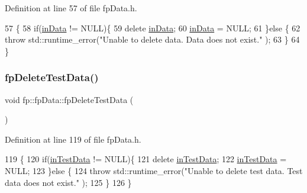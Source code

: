 Definition at line 57 of file fp\+Data.\+h.


\begin{DoxyCode}
57                                \{
58                 \textcolor{keywordflow}{if}(\hyperlink{classfp_1_1fpData_a49d7c3f58bcf88843c25b1b0c9714ebe}{inData} != NULL)\{
59                     \textcolor{keyword}{delete} \hyperlink{classfp_1_1fpData_a49d7c3f58bcf88843c25b1b0c9714ebe}{inData};
60                     \hyperlink{classfp_1_1fpData_a49d7c3f58bcf88843c25b1b0c9714ebe}{inData} = NULL;
61                 \}\textcolor{keywordflow}{else} \{
62                     \textcolor{keywordflow}{throw} std::runtime\_error(\textcolor{stringliteral}{"Unable to delete data.  Data does not exist."} );
63                 \}
64             \}
\end{DoxyCode}
\mbox{\label{classfp_1_1fpData_a996eedfc5ffe559ce1f6061af1efc1db}} 
\subsubsection{\texorpdfstring{fp\+Delete\+Test\+Data()}{fpDeleteTestData()}}
{\footnotesize\ttfamily void fp\+::fp\+Data\+::fp\+Delete\+Test\+Data (\begin{DoxyParamCaption}{ }\end{DoxyParamCaption})\hspace{0.3cm}{\ttfamily [inline]}}



Definition at line 119 of file fp\+Data.\+h.


\begin{DoxyCode}
119                                    \{
120                 \textcolor{keywordflow}{if}(\hyperlink{classfp_1_1fpData_ad4f4dd3a8d15633b7f983932fa60bbad}{inTestData} != NULL)\{
121                     \textcolor{keyword}{delete} \hyperlink{classfp_1_1fpData_ad4f4dd3a8d15633b7f983932fa60bbad}{inTestData};
122                     \hyperlink{classfp_1_1fpData_ad4f4dd3a8d15633b7f983932fa60bbad}{inTestData} = NULL;
123                 \}\textcolor{keywordflow}{else} \{
124                     \textcolor{keywordflow}{throw} std::runtime\_error(\textcolor{stringliteral}{"Unable to delete test data.  Test data does not exist."} );
125                 \}
126             \}
\end{DoxyCode}
\mbox{\label{classfp_1_1fpData_a91c727b1475eca340ca14c241b25c959}} 

